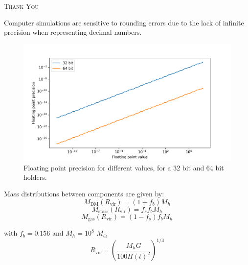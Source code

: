 \documentclass{beamer}
\newcommand{\sm}[0]{$M_\odot$}
\begin{document}
\begin{frame}
	\begin{center}
		\scshape\huge
		Thank You
	\end{center}
\end{frame}

%
%
%
%
%
%
%
%
%
%
%
%
%
%
%
%
%
%
%
%
\begin{frame}
	Computer simulations are sensitive to rounding errors due to the lack of infinite precision when representing decimal numbers.
	\begin{figure}[h]
		\centering
		\includegraphics[width=0.7\linewidth]{"../Files/Week 3/floating"}
		\caption{Floating point precision for different values, for a 32 bit and 64 bit holders.}
		\label{fig: IEEE-754}
	\end{figure}
\end{frame}

\begin{frame}
	Mass distributions between components are given by:
	\begin{equation}
		M_\text{DM}(R_\text{vir}) = (1 - f_b)M_h
	\end{equation}
	\begin{equation}
		M_\text{stars}(R_\text{vir}) = f_sf_bM_h
	\end{equation}
	\begin{equation}
		M_\text{gas}(R_\text{vir}) = (1 - f_s)f_bM_h
	\end{equation}
	
	with $f_b = 0.156$ and $M_h = 10^8$ \sm
	\begin{equation}
		R_\text{vir} = \left({\dfrac{M_hG}{100 H(t)^2}}\right)^{1/3}
	\end{equation}
\end{frame}
\end{document}
